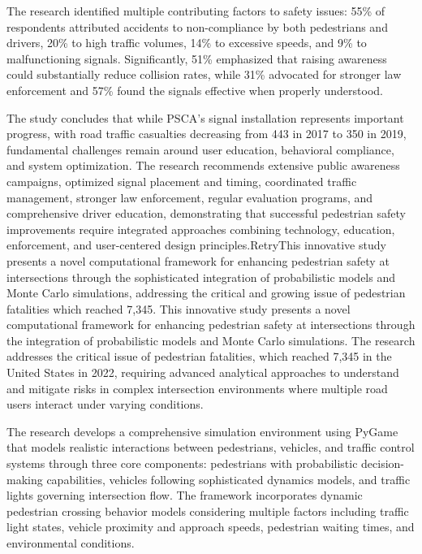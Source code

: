 \documentclass[a4paper, 12pt]{report}
\begin{document}
The research identified multiple contributing factors to safety issues: 55\% of respondents attributed accidents to non-compliance by both pedestrians and drivers, 20\% to high traffic volumes, 14\% to excessive speeds, and 9\% to malfunctioning signals. Significantly, 51\% emphasized that raising awareness could substantially reduce collision rates, while 31\% advocated for stronger law enforcement and 57\% found the signals effective when properly understood.

The study concludes that while PSCA's signal installation represents important progress, with road traffic casualties decreasing from 443 in 2017 to 350 in 2019, fundamental challenges remain around user education, behavioral compliance, and system optimization. The research recommends extensive public awareness campaigns, optimized signal placement and timing, coordinated traffic management, stronger law enforcement, regular evaluation programs, and comprehensive driver education, demonstrating that successful pedestrian safety improvements require integrated approaches combining technology, education, enforcement, and user-centered design principles.RetryThis innovative study presents a novel computational framework for enhancing pedestrian safety at intersections through the sophisticated integration of probabilistic models and Monte Carlo simulations, addressing the critical and growing issue of pedestrian fatalities which reached 7,345. This innovative study presents a novel computational framework for enhancing pedestrian safety at intersections through the integration of probabilistic models and Monte Carlo simulations. The research addresses the critical issue of pedestrian fatalities, which reached 7,345 in the United States in 2022, requiring advanced analytical approaches to understand and mitigate risks in complex intersection environments where multiple road users interact under varying conditions.

The research develops a comprehensive simulation environment using PyGame that models realistic interactions between pedestrians, vehicles, and traffic control systems through three core components: pedestrians with probabilistic decision-making capabilities, vehicles following sophisticated dynamics models, and traffic lights governing intersection flow. The framework incorporates dynamic pedestrian crossing behavior models considering multiple factors including traffic light states, vehicle proximity and approach speeds, pedestrian waiting times, and environmental conditions.
\end{document}

